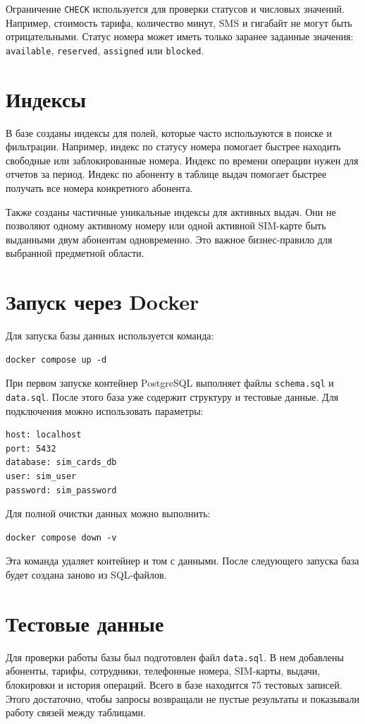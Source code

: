 Ограничение \texttt{CHECK} используется для проверки статусов и числовых значений. Например, стоимость тарифа, количество минут, SMS и гигабайт не могут быть отрицательными. Статус номера может иметь только заранее заданные значения: \texttt{available}, \texttt{reserved}, \texttt{assigned} или \texttt{blocked}.

\section{Индексы}

В базе созданы индексы для полей, которые часто используются в поиске и фильтрации. Например, индекс по статусу номера помогает быстрее находить свободные или заблокированные номера. Индекс по времени операции нужен для отчетов за период. Индекс по абоненту в таблице выдач помогает быстрее получать все номера конкретного абонента.

Также созданы частичные уникальные индексы для активных выдач. Они не позволяют одному активному номеру или одной активной SIM-карте быть выданными двум абонентам одновременно. Это важное бизнес-правило для выбранной предметной области.

\section{Запуск через Docker}

Для запуска базы данных используется команда:

\begin{verbatim}
docker compose up -d
\end{verbatim}

При первом запуске контейнер PostgreSQL выполняет файлы \texttt{schema.sql} и \texttt{data.sql}. После этого база уже содержит структуру и тестовые данные. Для подключения можно использовать параметры:

\begin{verbatim}
host: localhost
port: 5432
database: sim_cards_db
user: sim_user
password: sim_password
\end{verbatim}

Для полной очистки данных можно выполнить:

\begin{verbatim}
docker compose down -v
\end{verbatim}

Эта команда удаляет контейнер и том с данными. После следующего запуска база будет создана заново из SQL-файлов.

\section{Тестовые данные}

Для проверки работы базы был подготовлен файл \texttt{data.sql}. В нем добавлены абоненты, тарифы, сотрудники, телефонные номера, SIM-карты, выдачи, блокировки и история операций. Всего в базе находится 75 тестовых записей. Этого достаточно, чтобы запросы возвращали не пустые результаты и показывали работу связей между таблицами.
